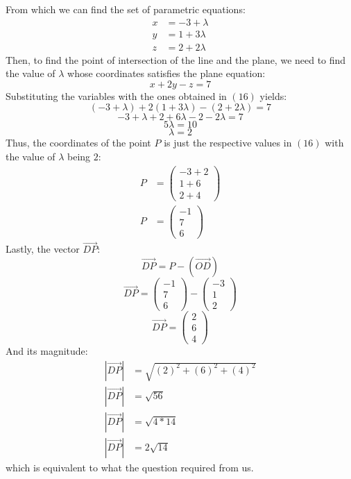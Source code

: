 \documentclass[hidelinks, a4paper, 12pt]{article}
\begin{document}
            From which we can find the set of parametric equations:
            \begin{equation}
                \begin{split}
                    x &= -3 + \lambda\\
                    y &= 1 + 3\lambda\\
                    z &= 2 + 2\lambda
                \end{split}
            \end{equation}
            Then, to find the point of intersection of the line and the plane, we need to find the value of $\lambda$ whose coordinates satisfies the plane equation:
            \[x + 2y - z = 7\]
            Substituting the variables with the ones obtained in $(16)$ yields:
            \[(-3 + \lambda) + 2(1 + 3\lambda) - (2 + 2\lambda) = 7\]
            \[-3 + \lambda + 2 + 6\lambda - 2 - 2\lambda = 7\]
            \[5\lambda = 10\]
            \[\lambda = 2\]
            Thus, the coordinates of the point $P$ is just the respective values in $(16)$ with the value of $\lambda$ being $2$:
            \[\begin{split}
                P &= \begin{pmatrix} -3 + 2 \\ 1 + 6 \\ 2 + 4 \end{pmatrix}\\
                P &= \begin{pmatrix} -1 \\ 7 \\ 6 \end{pmatrix}
            \end{split}\]
            Lastly, the vector $\vec{DP}$:
            \[\vec{DP} = P - (\vec{OD})\]
            \[\vec{DP} = \begin{pmatrix} -1 \\ 7 \\ 6 \end{pmatrix} - \begin{pmatrix} -3 \\ 1 \\ 2 \end{pmatrix}\]
            \[\vec{DP} = \begin{pmatrix} 2 \\ 6 \\ 4 \end{pmatrix}\]
            And its magnitude:
            \[\begin{split}
                |\vec{DP}| &= \sqrt{(2)^2 + (6)^2 + (4)^2}\\
                |\vec{DP}| &= \sqrt{56}\\
                |\vec{DP}| &= \sqrt{4 * 14}\\
                |\vec{DP}| &= 2\sqrt{14}
            \end{split}\]
            which is equivalent to what the question required from us.
\end{document}
